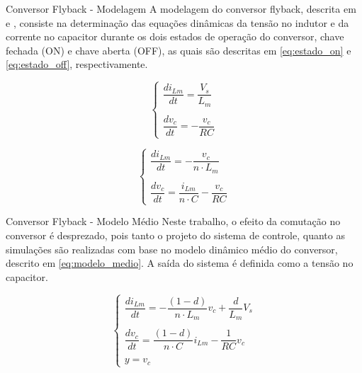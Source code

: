 \documentclass[xcolor=dvipsnames,aspectratio=169]{beamer}
\begin{document}
\begin{frame}{Conversor Flyback - Modelagem}
    A modelagem do conversor flyback, descrita em \cite{Erickson2020} e \cite{Hart2012}, consiste na determinação das equações dinâmicas da tensão no indutor e da corrente no capacitor durante os dois estados de operação do conversor, chave fechada (ON) e chave aberta (OFF), as quais são descritas em  \eqref{eq:estado_on} e \eqref{eq:estado_off}, respectivamente.

    \begin{equation}
        \begin{cases}
            \dfrac{di_{Lm}}{dt} = \dfrac{V_s}{L_m} \\ \\
            \dfrac{dv_c}{dt} = -\dfrac{v_c}{RC}
        \end{cases}
        \label{eq:estado_on}
    \end{equation}


    \begin{equation}
        \begin{cases}
            \dfrac{d i_{Lm}}{dt} = - \dfrac{v_c}{n \cdot L_m} \\ \\
            \dfrac{dv_c}{dt} = \dfrac{i_{Lm}}{n \cdot C} - \dfrac{v_c}{RC}
        \end{cases}
        \label{eq:estado_off}
    \end{equation}

\end{frame}

\begin{frame}{Conversor Flyback - Modelo Médio}
    Neste trabalho, o efeito da comutação no conversor é desprezado, pois tanto o projeto do sistema de controle, quanto as simulações são realizadas com base no modelo dinâmico médio do conversor, descrito em \eqref{eq:modelo_medio}. A saída do sistema é definida como a tensão no capacitor.

    \begin{equation}
        \begin{cases}
            \dfrac{d i_{Lm}}{dt} = - \dfrac{(1-d)}{n \cdot L_m} v_c + \dfrac{d}{L_m} V_s \\ \\
            \dfrac{dv_c}{dt} = \dfrac{(1-d)}{n \cdot C} i_{Lm} - \dfrac{1}{RC} v_c       \\ \\
            y = v_c
        \end{cases}
        \label{eq:modelo_medio}
    \end{equation}
\end{frame}
\end{document}
